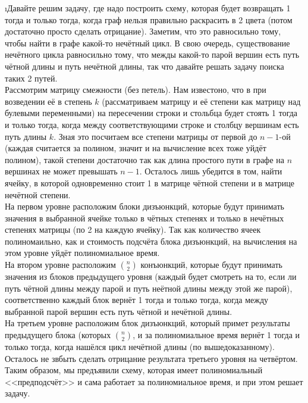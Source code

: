 \i Давайте решим задачу, где надо построить схему, которая будет возвращать 1 тогда и только тогда, когда граф нельзя правильно раскрасить в 2 цвета (потом достаточно просто сделать отрицание). Заметим, что это равносильно тому, чтобы найти в графе какой-то нечётный цикл. В свою очередь, существование нечётного цикла равносильно тому, что межды какой-то парой вершин есть путь чётной длины и путь нечётной длины, так что давайте решать задачу поиска таких 2 путей.\\
Рассмотрим матрицу смежности (без петель). Нам известоно, что в при возведении её в степень $k$ (рассматриваем матрицу и её степени как матрицу над булевыми переменными) на пересечении строки и стольбца будет стоять 1 тогда и только тогда, когда между соответствующими строке и столбцу вершинам есть путь длины $k$. Зная это посчитаем все степени матрицы от первой до $n-1$-ой (каждая считается за полином, значит и на вычисление всех тоже уйдёт полином), такой степени достаточно так как длина простого пути в графе на $n$ вершинах не может превышать $n-1$. Осталось лишь убедится в том, найти ячейку, в которой одновременно стоит 1 в матрице чётной степени и в матрице нечётной степени.\\
На первом уровне расположим блоки дизъюнкций, которые будут принимать значения в выбранной ячейке только в чётных степенях и только в нечётных степенях матрицы (по 2 на каждую ячейку). Так как количество ячеек полиномаильно, как и стоимость подсчёта блока дизъюнкций, на вычисления на этом уровне уйдёт полиномиальное время.\\
На втором уровне расположим $\binom{n}{2}$ конъюнкций, которые будут принимать значения из блоков предыдущего уровня (каждый будет смотреть на то, если ли путь чётной длины между парой и путь неётной длины между этой же парой), соответственно каждый блок вернёт 1 тогда и только тогда, когда между выбранной парой вершин есть путь чётной и нечётной длины.\\
На третьем уровне расположим блок дизъюнкций, который примет результаты предыдущего блока (которых $\binom{n}{2}$, и за полиномиальное время вернёт 1 тогда и только тогда, когда нашёлся цикл нечётной длины (по вышедоказанному).\\
Осталось не звбыть сделать отрицание результата третьего уровня на четвёртом.\\
Таким образом, мы предъявили схему, которая имеет полиномиальный <<предподсчёт>> и сама работает за полиномиальное время, и при этом решает задачу.